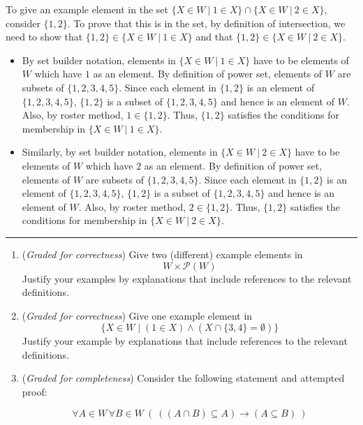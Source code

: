 \documentclass[12pt, oneside]{article}
\newcommand{\gradeCorrect}{({\it Graded for correctness}) }
\newcommand{\gradeComplete}{({\it Graded for completeness}) }
\begin{document}
\begin{enumerate}[labelindent=0pt, leftmargin=0pt]
    To give an example element in the set 
    $\{ X \in W ~|~ 1 \in X \} \cap \{ X \in W ~|~  2 \in X \}$,
    consider $\{ 1,2\}$. To prove that this is in the set, by definition of intersection, we need to show
    that $\{1,2\} \in \{ X \in W ~|~ 1 \in X \}$ and that $\{1,2\} \in \{ X \in W ~|~ 2 \in X \}$.
    \begin{itemize}
    \item By set builder notation, elements in $\{ X \in W ~|~ 1 \in X \}$ have to be elements of $W$ which have $1$ as an element. By definition of power set, elements of $W$ are subsets of $\{1,2,3,4,5\}$. Since
    each element in $\{1,2\}$ is an element of $\{1,2,3,4,5\}$, $\{1,2\}$ is a subset of $\{1,2,3,4,5\}$ 
    and hence is an element of $W$. Also, by roster method, $1 \in \{1,2\}$. Thus, $\{1,2\}$ satisfies the 
    conditions for membership in $\{ X \in W ~|~ 1 \in X \}$.
    \item Similarly, by set builder notation, elements in $\{ X \in W ~|~ 2 \in X \}$ have to be elements of $W$ 
    which have $2$ as an element. 
    By definition of power set, elements of $W$ are subsets of $\{1,2,3,4,5\}$. Since
    each element in $\{1,2\}$ is an element of $\{1,2,3,4,5\}$, $\{1,2\}$ is a subset of $\{1,2,3,4,5\}$ 
    and hence is an element of $W$. Also, by roster method, $2 \in \{1,2\}$. Thus, $\{1,2\}$ satisfies the 
    conditions for membership in $\{ X \in W ~|~ 2 \in X \}$.
    \end{itemize}
    
    \rule{0.5\textwidth}{.4pt}
    
    
    \begin{enumerate}
    \item\gradeCorrect Give two (different) example elements in 
    \[
    W \times \mathcal{P}(W)
    \]
    Justify your examples by explanations that include references to the relevant definitions.
    
    \item\gradeCorrect Give one example element in 
    \[
    \{ X \in W \mid (1 \in X) \land (X \cap \{3,4\} = \emptyset) \}
    \]
    Justify your example by explanations that include references to the relevant definitions.
    
    \item\gradeComplete Consider the following statement and attempted proof:
    
    
    $$\forall A \in W \, \forall B \in W ~\left(~((A \cap B) \subseteq A) \to (A \subseteq B)~\right)$$
    

\end{enumerate}
\end{enumerate}
\end{document}

